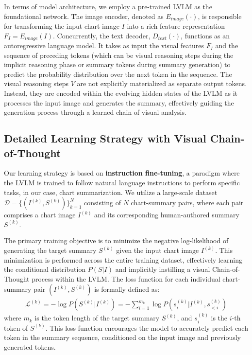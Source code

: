 In terms of model architecture, we employ a pre-trained LVLM as the foundational network.  The image encoder, denoted as $E_{image}(\cdot)$, is responsible for transforming the input chart image $I$ into a rich feature representation $F_I = E_{image}(I)$.  Concurrently, the text decoder, $D_{text}(\cdot)$, functions as an autoregressive language model. It takes as input the visual features $F_I$ and the sequence of preceding tokens (which can be visual reasoning steps during the implicit reasoning phase or summary tokens during summary generation) to predict the probability distribution over the next token in the sequence.  The visual reasoning steps $V$ are not explicitly materialized as separate output tokens. Instead, they are encoded within the evolving hidden states of the LVLM as it processes the input image and generates the summary, effectively guiding the generation process through a learned chain of visual analysis.

\subsection{Detailed Learning Strategy with Visual Chain-of-Thought}

Our learning strategy is based on \textbf{instruction fine-tuning}, a paradigm where the LVLM is trained to follow natural language instructions to perform specific tasks, in our case, chart summarization.  We utilize a large-scale dataset $\mathcal{D} = \{(I^{(k)}, S^{(k)})\}_{k=1}^{N}$ consisting of $N$ chart-summary pairs, where each pair comprises a chart image $I^{(k)}$ and its corresponding human-authored summary $S^{(k)}$.

The primary training objective is to minimize the negative log-likelihood of generating the target summary $S^{(k)}$ given the input chart image $I^{(k)}$. This minimization is performed across the entire training dataset, effectively learning the conditional distribution $P(S|I)$ and implicitly instilling a visual Chain-of-Thought process within the LVLM.  The loss function for each individual chart-summary pair $(I^{(k)}, S^{(k)})$ is formally defined as:
\begin{align}
    \mathcal{L}^{(k)} = - \log P(S^{(k)}|I^{(k)}) = - \sum_{i=1}^{m_k} \log P(s_i^{(k)} | I^{(k)}, s_{<i}^{(k)})
\end{align}
where $m_k$ is the token length of the target summary $S^{(k)}$, and $s_i^{(k)}$ is the $i$-th token of $S^{(k)}$.  This loss function encourages the model to accurately predict each token in the summary sequence, conditioned on the input image and previously generated tokens.


